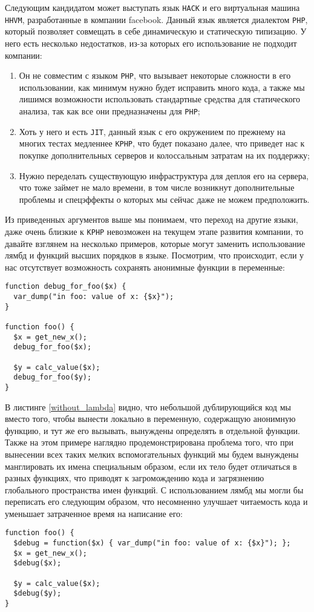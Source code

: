 Следующим кандидатом может выступать язык \verb|HACK| и его виртуальная машина \verb|HHVM|, разработанные в компании facebook.
Данный язык является диалектом \verb|PHP|, который позволяет совмещать в себе динамическую и статическую типизацию.
У него есть несколько недостатков, из-за которых его использование не подходит компании:

\begin{enumerate}
\item Он не совместим с языком \verb|PHP|, что вызывает некоторые сложности в его использовании, как минимум нужно будет исправить много кода, а также мы лишимся возможности использовать стандартные средства для статического анализа, так как все они предназначены для \verb|PHP|;

\item Хоть у него и есть \verb|JIT|, данный язык с его окружением по прежнему на многих тестах медленнее \verb|KPHP|, что будет показано далее, что приведет нас к покупке дополнительных серверов и колоссальным затратам на их поддержку;

\item Нужно переделать существующую инфраструктура для деплоя его на сервера, что тоже займет не мало времени, в том числе возникнут дополнительные проблемы и спецэффекты о которых мы сейчас даже не можем предположить.
\end{enumerate}

Из приведенных аргументов выше мы понимаем, что переход на другие языки, даже очень близкие к \verb|KPHP| невозможен на текущем этапе развития компании, то давайте взглянем на несколько примеров, которые могут заменить использование лямбд и функций высших порядков в языке.
Посмотрим, что происходит, если у нас отсутствует возможность сохранять анонимные функции в переменные:
\begin{lstlisting}[caption={Пример кода без анонимных функций},label={without_lambda}]
function debug_for_foo($x) {
  var_dump("in foo: value of x: {$x}");
}

function foo() {
  $x = get_new_x();
  debug_for_foo($x);

  $y = calc_value($x);
  debug_for_foo($y);
}
\end{lstlisting}

В листинге \ref{without_lambda} видно, что небольшой дублирующийся код мы вместо того, чтобы вынести локально в переменную, содержащую анонимную функцию, и тут же его вызывать, вынуждены определять в отдельной функции.
Также на этом примере наглядно продемонстрирована проблема того, что при вынесении всех таких мелких вспомогательных функций мы будем вынуждены манглировать их имена специальным образом, если их тело будет отличаться в разных функциях, что приводят к загромождению кода и загрязнению глобального пространства имен функций.
С использованием лямбд мы могли бы переписать его следующим образом, что несомненно улучшает читаемость кода и уменьшает затраченное время на написание его:
\begin{lstlisting}
function foo() {
  $debug = function($x) { var_dump("in foo: value of x: {$x}"); };
  $x = get_new_x();
  $debug($x);

  $y = calc_value($x);
  $debug($y);
}
\end{lstlisting}

